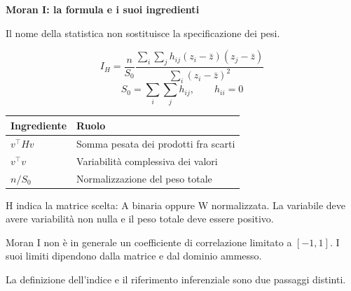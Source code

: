 \documentclass[12pt,aspectratio=1610]{beamer}
\newcommand{\PBody}[1]{\par{\fontsize{11.3}{14.8}\selectfont #1\par}}
\newcommand{\PSmall}[1]{\par{\fontsize{9.8}{13.1}\selectfont #1\par}}
\newcommand{\PInfo}[1]{%
\begin{tcolorbox}[enhanced,arc=1.6mm,boxrule=.55pt,colback=GeoTint,
 colframe=Rule!80!Classical,left=2.3mm,right=2.3mm,top=2mm,bottom=2mm,
 before skip=1mm,after skip=1mm]
\PSmall{#1}\end{tcolorbox}}
\begin{document}
\begin{frame}[plain]\hypertarget{slide57}{}
\begin{lrbox}{\TitleBox}
\begin{minipage}[t]{17.7cm}\raggedright\color{Ink}\fontsize{11.3}{14.8}\selectfont
\color{Navy}\bfseries\fontsize{20.6}{24.5}\selectfont Moran I: la formula e i suoi ingredienti
\end{minipage}\end{lrbox}

\begin{lrbox}{\RecallBox}
\begin{minipage}[t]{14.3cm}\raggedright\color{Ink}\fontsize{11.3}{14.8}\selectfont
\fontsize{10.3}{13.8}\selectfont Il nome della statistica non sostituisce la specificazione dei pesi.
\end{minipage}\end{lrbox}

\begin{lrbox}{\PilotLeftBox}
\begin{minipage}[t]{10.05cm}\raggedright\color{Ink}\fontsize{11.3}{14.8}\selectfont
\[I_H=\frac{n}{S_0}\frac{\sum_i\sum_jh_{ij}(z_i-\bar z)(z_j-\bar z)}{\sum_i(z_i-\bar z)^2}\]
\[S_0=\sum_i\sum_jh_{ij},\qquad h_{ii}=0\]
{\fontsize{10.2}{13.1}\selectfont\renewcommand{\arraystretch}{1.45}\begin{tabular}{@{}p{3.0cm}p{6.0cm}@{}}\toprule
\textbf{Ingrediente} & \textbf{Ruolo}\\\midrule
$v^\top Hv$ & Somma pesata dei prodotti fra scarti\\
$v^\top v$ & Variabilità complessiva dei valori\\
$n/S_0$ & Normalizzazione del peso totale\\
\bottomrule\end{tabular}}

\end{minipage}\end{lrbox}

\begin{lrbox}{\PilotRightBox}
\begin{minipage}[t]{7.55cm}\raggedright\color{Ink}\fontsize{11.3}{14.8}\selectfont
\PBody{H indica la matrice scelta: A binaria oppure W normalizzata. La variabile deve avere variabilità non nulla e il peso totale deve essere positivo.}
\vspace{2.5mm}
\PInfo{Moran I non è in generale un coefficiente di correlazione limitato a $[-1,1]$. I suoi limiti dipendono dalla matrice e dal dominio ammesso.}
\PSmall{La definizione dell’indice e il riferimento inferenziale sono due passaggi distinti.}


\end{minipage}
\end{lrbox}
\end{frame}
\end{document}
